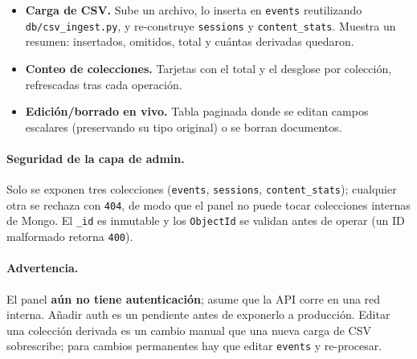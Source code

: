 \documentclass[12pt, letterpaper]{article}
\newcommand{\code}[1]{\texttt{#1}}
\begin{document}
\begin{itemize}[leftmargin=*]
  \item \textbf{Carga de CSV.} Sube un archivo, lo inserta en \code{events}
        reutilizando \code{db/csv\_ingest.py}, y re-construye \code{sessions} y
        \code{content\_stats}. Muestra un resumen: insertados, omitidos, total y
        cuántas derivadas quedaron.
  \item \textbf{Conteo de colecciones.} Tarjetas con el total y el desglose por
        colección, refrescadas tras cada operación.
  \item \textbf{Edición/borrado en vivo.} Tabla paginada donde se editan campos
        escalares (preservando su tipo original) o se borran documentos.
\end{itemize}

\paragraph{Seguridad de la capa de admin.} Solo se exponen tres colecciones
(\code{events}, \code{sessions}, \code{content\_stats}); cualquier otra se
rechaza con \code{404}, de modo que el panel no puede tocar colecciones internas
de Mongo. El \code{\_id} es inmutable y los \code{ObjectId} se validan antes de
operar (un ID malformado retorna \code{400}).

\paragraph{Advertencia.} El panel \textbf{aún no tiene autenticación}; asume que
la API corre en una red interna. Añadir auth es un pendiente antes de exponerlo a
producción. Editar una colección derivada es un cambio manual que una nueva carga
de CSV sobrescribe; para cambios permanentes hay que editar \code{events} y
re-procesar.

\end{document}
